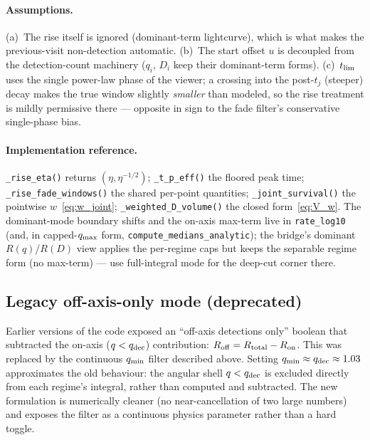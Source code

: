 \documentclass[11pt,a4paper]{article}
\begin{document}
\paragraph{Assumptions.} (a)~The rise itself is ignored (dominant-term lightcurve), which is what makes the previous-visit non-detection automatic. (b)~The start offset $u$ is decoupled from the detection-count machinery ($q_i$, $D_i$ keep their dominant-term forms). (c)~$t_{\rm lim}$ uses the single power-law phase of the viewer; a crossing into the post-$t_j$ (steeper) decay makes the true window slightly \emph{smaller} than modeled, so the rise treatment is mildly permissive there --- opposite in sign to the fade filter's conservative single-phase bias.

\paragraph{Implementation reference.} \texttt{\_rise\_eta()} returns $(\eta,\eta^{-1/2})$; \texttt{\_t\_p\_eff()} the floored peak time; \texttt{\_rise\_fade\_windows()} the shared per-point quantities; \texttt{\_joint\_survival()} the pointwise $w$~\eqref{eq:w_joint}; \texttt{\_weighted\_D\_volume()} the closed form~\eqref{eq:V_w}. The dominant-mode boundary shifts and the on-axis max-term live in \texttt{rate\_log10} (and, in capped-$q_{\rm max}$ form, \texttt{compute\_medians\_analytic}); the bridge's dominant $R(q)$/$R(D)$ view applies the per-regime caps but keeps the separable regime form (no max-term) --- use full-integral mode for the deep-cut corner there.

\subsection{Legacy off-axis-only mode (deprecated)}
\label{sec:filters_legacy}

Earlier versions of the code exposed an ``off-axis detections only'' boolean that subtracted the on-axis ($q<q_{\rm dec}$) contribution: $R_{\rm off}=R_{\rm total}-R_{\rm on}$.
This was replaced by the continuous $q_{\rm min}$ filter described above.
Setting $q_{\rm min}\approx q_{\rm dec}\approx 1.03$ approximates the old behaviour: the angular shell $q<q_{\rm dec}$ is excluded directly from each regime's integral, rather than computed and subtracted.
The new formulation is numerically cleaner (no near-cancellation of two large numbers) and exposes the filter as a continuous physics parameter rather than a hard toggle.

\end{document}
